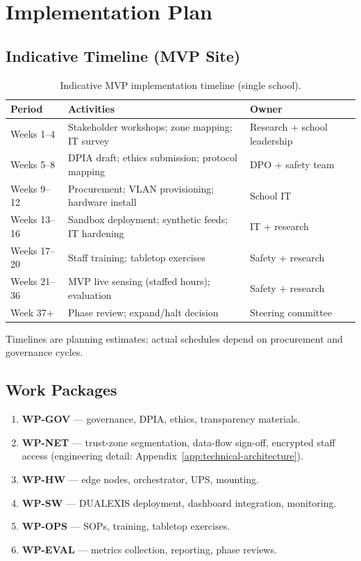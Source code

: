 \section{Implementation Plan}
\label{sec:implementation-plan}

\subsection{Indicative Timeline (MVP Site)}

\begin{table}[htbp]
  \centering
  \caption{Indicative MVP implementation timeline (single school).}
  \label{tab:timeline}
  \small
  \begin{tabular}{@{}p{2.4cm}p{5.2cm}p{4.4cm}@{}}
    \toprule
    Period & Activities & Owner \\
    \midrule
    Weeks 1--4 &
      Stakeholder workshops; zone mapping; IT survey &
      Research + school leadership \\
    Weeks 5--8 &
      DPIA draft; ethics submission; protocol mapping &
      DPO + safety team \\
    Weeks 9--12 &
      Procurement; VLAN provisioning; hardware install &
      School IT \\
    Weeks 13--16 &
      Sandbox deployment; synthetic feeds; IT hardening &
      IT + research \\
    Weeks 17--20 &
      Staff training; tabletop exercises &
      Safety + research \\
    Weeks 21--36 &
      MVP live sensing (staffed hours); evaluation &
      Safety + research \\
    Week 37+ &
      Phase review; expand/halt decision &
      Steering committee \\
    \bottomrule
  \end{tabular}
\end{table}

Timelines are planning estimates; actual schedules depend on procurement and governance cycles.

\subsection{Work Packages}

\begin{enumerate}[noitemsep]
  \item \textbf{WP-GOV} --- governance, DPIA, ethics, transparency materials.
  \item \textbf{WP-NET} --- trust-zone segmentation, data-flow sign-off, encrypted staff access
        (engineering detail: Appendix~\ref{app:technical-architecture}).
  \item \textbf{WP-HW} --- edge nodes, orchestrator, UPS, mounting.
  \item \textbf{WP-SW} --- DUALEXIS deployment, dashboard integration, monitoring.
  \item \textbf{WP-OPS} --- SOPs, training, tabletop exercises.
  \item \textbf{WP-EVAL} --- metrics collection, reporting, phase reviews.
\end{enumerate}

